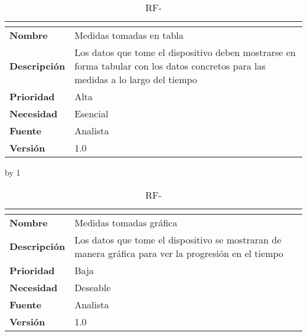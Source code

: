 \begin{table}[H]
	\caption{RF-\number\rf}
	\begin{tabular}{|l|p{}|}
		\hline
		\multicolumn{2}{|c|}{\cellcolor[HTML]{BFBFBF}{\color[HTML]{000000} \textbf{RF-\number\rf}}} \\ \hline
		\textbf{Nombre}      & Medidas tomadas en tabla                                                                                                          \\ \hline
		\textbf{Descripción} & Los datos que tome el dispositivo deben mostrarse en forma tabular con los datos concretos para las medidas a lo largo del tiempo \\ \hline
		\textbf{Prioridad}   & Alta                                                                                                                              \\ \hline
		\textbf{Necesidad}   & Esencial                                                                                                                          \\ \hline
		\textbf{Fuente}      & Analista                                                                                                                          \\ \hline
		\textbf{Versión}     & 1.0                                                                                                                               \\ \hline
	\end{tabular}
\end{table}
\advance\rf by 1
\begin{table}[H]
	\caption{RF-\number\rf}
	\begin{tabular}{|l|p{}|}
		\hline
		\multicolumn{2}{|c|}{\cellcolor[HTML]{BFBFBF}{\color[HTML]{000000} \textbf{RF-\number\rf}}} \\ \hline
		\textbf{Nombre}      & Medidas tomadas gráfica                                                                              \\ \hline
		\textbf{Descripción} & Los datos que tome el dispositivo se mostraran de manera gráfica para ver la progresión en el tiempo \\ \hline
		\textbf{Prioridad}   & Baja                                                                                                 \\ \hline
		\textbf{Necesidad}   & Deseable                                                                                             \\ \hline
		\textbf{Fuente}      & Analista                                                                                             \\ \hline
		\textbf{Versión}     & 1.0                                                                                                  \\ \hline
	\end{tabular}
\end{table}

